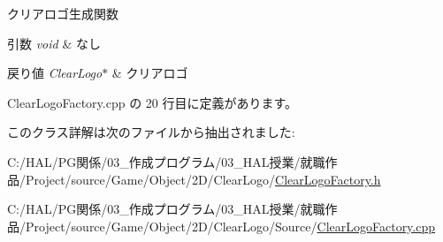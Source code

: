 クリアロゴ生成関数 


\begin{DoxyParams}{引数}
{\em void} & なし \\
\hline
\end{DoxyParams}

\begin{DoxyRetVals}{戻り値}
{\em Clear\+Logo$\ast$} & クリアロゴ \\
\hline
\end{DoxyRetVals}


 Clear\+Logo\+Factory.\+cpp の 20 行目に定義があります。



このクラス詳解は次のファイルから抽出されました\+:\begin{DoxyCompactItemize}
\item 
C\+:/\+H\+A\+L/\+P\+G関係/03\+\_\+作成プログラム/03\+\_\+\+H\+A\+L授業/就職作品/\+Project/source/\+Game/\+Object/2\+D/\+Clear\+Logo/\mbox{\hyperlink{_clear_logo_factory_8h}{Clear\+Logo\+Factory.\+h}}\item 
C\+:/\+H\+A\+L/\+P\+G関係/03\+\_\+作成プログラム/03\+\_\+\+H\+A\+L授業/就職作品/\+Project/source/\+Game/\+Object/2\+D/\+Clear\+Logo/\+Source/\mbox{\hyperlink{_clear_logo_factory_8cpp}{Clear\+Logo\+Factory.\+cpp}}\end{DoxyCompactItemize}
